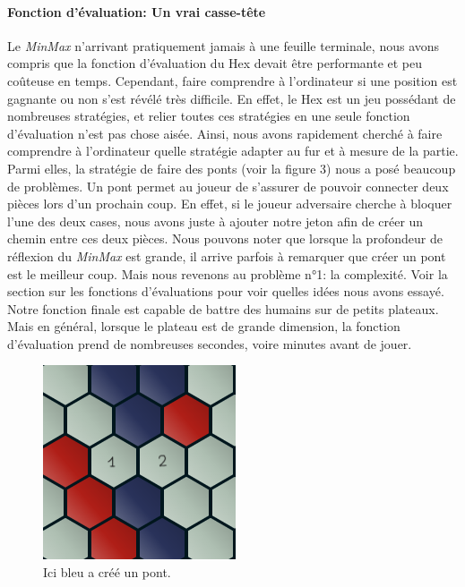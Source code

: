\paragraph{Fonction d'évaluation: Un vrai casse-tête}
Le \emph{MinMax} n'arrivant pratiquement jamais à une feuille terminale, nous avons compris que la fonction
d'évaluation du Hex devait être performante et peu coûteuse en temps. Cependant, faire comprendre à l'ordinateur si une position est gagnante
ou non s'est révélé très difficile. En effet, le Hex est un jeu possédant de nombreuses stratégies, et relier toutes ces stratégies en une
seule fonction d'évaluation n'est pas chose aisée. Ainsi, nous avons rapidement cherché à faire comprendre à l'ordinateur
quelle stratégie adapter au fur et à mesure de la partie. Parmi elles, la stratégie de faire des ponts (voir la figure 3) nous a posé beaucoup de problèmes.
Un pont permet au joueur de s'assurer de pouvoir connecter deux pièces lors d'un prochain coup. En effet, si le joueur adversaire cherche à bloquer
l'une des deux cases, nous avons juste à ajouter notre jeton afin de créer un chemin entre ces deux pièces. Nous pouvons noter que lorsque la profondeur de
réflexion du \emph{MinMax} est grande, il arrive parfois à remarquer que créer un pont est le meilleur coup. Mais nous revenons au problème n°1: la complexité.
Voir la section sur les fonctions d'évaluations pour voir quelles idées nous avons essayé. Notre fonction finale est capable de battre des humains sur de petits 
plateaux. Mais en général, lorsque le plateau est de grande dimension, la fonction d'évaluation prend de nombreuses secondes, voire minutes avant de jouer.

\begin{figure}[h]
    \begin{center}
        \includegraphics[scale=0.5]{root/pont.png}
    \end{center}
    \caption[1]{Ici bleu a créé un pont\footnotemark.}\label{fig:pont_bleu}
\end{figure}

